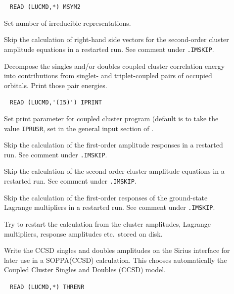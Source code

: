 \begin{description}
\item[] \verb| |\newline
       \verb|READ (LUCMD,*) MSYM2|

       Set number of irreducible representations. 
 
\item[] 
   Skip the calculation of right-hand side vectors for the 
   second-order cluster amplitude equations
   in a restarted run. See comment under \verb|.IMSKIP|.
%
%

%
%
\item[]
         Decompose the singles and/or doubles coupled cluster correlation energy
         into contributions from singlet- and triplet-coupled
         pairs of occupied orbitals. Print those pair energies.

\item[]  \verb| |\newline
\verb|READ (LUCMD,'(I5)') IPRINT|

       Set print parameter for coupled cluster program
       (default is to take the value \verb+IPRUSR+, set in the general
       input section of \dalton\).
%
\item[] 
   Skip the calculation of the first-order amplitude responses
   in a restarted run. See comment under \verb|.IMSKIP|.
%
\item[] 
   Skip the calculation of the 
   second-order cluster amplitude equations
   in a restarted run. See comment under \verb|.IMSKIP|.
%
\item[] 
   Skip the calculation of the first-order responses of the 
   ground-state Lagrange multipliers in a restarted run. See comment under \verb|.IMSKIP|.
%
\item[] 
       Try to restart the calculation from the cluster amplitudes,
       Lagrange multipliers, response amplitudes etc.\ stored on
       disk.
%
\item[] 
       Write the CCSD singles and doubles amplitudes on the Sirius interface
       for later use in a SOPPA(CCSD) calculation. This
       chooses automatically the Coupled Cluster Singles and Doubles (CCSD) model.
%
\item[] \verb| |\newline
       \verb|READ (LUCMD,*) THRENR|


\end{description}
